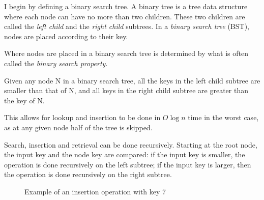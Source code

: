 I begin by defining a binary search tree. A binary tree is a tree data structure where each node can have no more than two children. These two children are 
called the \textit{left child} and the \textit{right child} subtrees. In a \textit{binary search tree} (BST), nodes are placed according to their key. 

Where nodes are placed in a binary search tree is determined by what is often called the \textit{binary search property}.

\begin{definition}
  \label{def:bst_property}
  Given any node N in a binary search tree, all the keys in the left child subtree are smaller than that of N, and all keys in the right child subtree are greater than the 
  key of N.
\end{definition}

This allows for lookup and insertion to be done in $O \log n$ time in the worst case, as at any given node half of the tree is skipped.

Search, insertion and retrieval can be done recursively. Starting at the root node, the input key and the node key are compared: if the input key is smaller,
the operation is done recursively on the left subtree; if the input key is larger, then the operation is done recursively on the right subtree.

\begin{figure}[!ht]
  \centering
  \hspace{1cm}%
    \hspace{1cm}%
    \caption{Example of an insertion operation with key 7}
    \label{fig:insert}
\end{figure}


